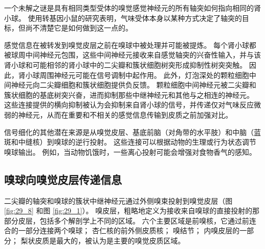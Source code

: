 一个未解之谜是具有相同类型受体的嗅觉感觉神经元的所有轴突如何指向相同的肾小球。 使用转基因小鼠的研究表明，气味受体本身以某种方式决定了轴突的目标，但尚不清楚它是如何做到这一点的。

感觉信息在被转发到嗅觉皮层之前在嗅球中被处理并可能被提炼。 每个肾小球都被球周中间神经元包围，这些中间神经元接收来自感觉轴突的兴奋性输入，并与该肾小球和可能相邻的肾小球中的二尖瓣和簇状细胞树突形成抑制性树突突触。 因此，肾小球周围神经元可能在信号调制中起作用。 此外，灯泡深处的颗粒细胞中间神经元向二尖瓣细胞和簇状细胞提供负反馈。 颗粒细胞中间神经元被二尖瓣和簇状细胞的基底树突兴奋，进而抑制那些中继神经元和其他与之相连的神经元。 这些连接提供的横向抑制被认为会抑制来自肾小球的信号，并传递仅对气味反应微弱的神经元，从而在重要和不相关的感觉信息传输到皮质之前加强对比。

信号细化的其他潜在来源是从嗅觉皮层、基底前脑（对角带的水平肢）和中脑（蓝斑和中缝核）到嗅球的逆行投射。 这些连接可以根据动物的生理或行为状态调节嗅球输出。 例如，当动物饥饿时，一些离心投射可能会增强对食物香气的感知。

\subsection{嗅球向嗅觉皮层传递信息}
二尖瓣的轴突和嗅球的簇状中继神经元通过外侧嗅束投射到嗅觉皮层（图 \ref{fig:29_8} 和图 \ref{fig:29_1}）。 
嗅皮层，粗略地定义为接收来自嗅球的直接投射的那部分皮层，包括多个解剖学上不同的区域。 六个主要区域是前嗅核，它通过前连合的一部分连接两个嗅球； 杏仁核的前外侧皮质核； 嗅结节； 内嗅皮层的一部分； 梨状皮质是最大的，被认为是主要的嗅觉皮质区域。

